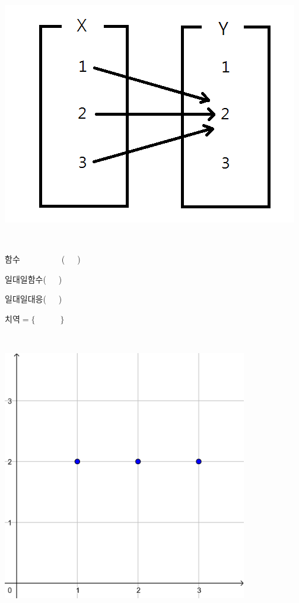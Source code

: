 \documentclass[a4paper]{oblivoir}
\begin{document}
%
\begin{minipage}{0.4\textwidth}
\includegraphics[width=\textwidth]{constantfunction}
\end{minipage}
~
\begin{minipage}{0.20\textwidth}
함수~~~~~~~~~~(~~~)\par\bigskip
일대일함수(~~~)\par\bigskip
일대일대응(~~~)\par\bigskip
치역\(=\{\qquad\quad\}\)
\end{minipage}
~
\begin{minipage}{0.35\textwidth}
\includegraphics[width=0.8\textwidth]{constantfunction-}
\end{minipage}
\end{document}
